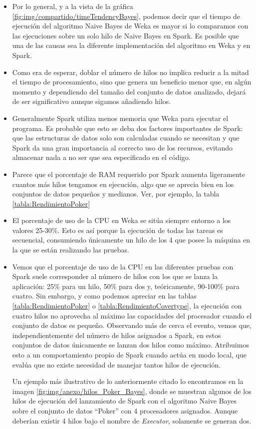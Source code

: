 \begin{itemize}
	\item Por lo general, y a la vista de la gráfica \ref{fig:img/compartido/timeTendencyBayes}, podemos decir que el tiempo de ejecución del algoritmo Naive Bayes de Weka es mayor si lo comparamos con las ejecuciones sobre un solo hilo de Naive Bayes en Spark. Es posible que una de las causas sea la diferente implementación del algoritmo en Weka y en Spark.
	\item Como era de esperar, doblar el número de hilos no implica reducir a la mitad el tiempo de procesamiento, sino que genera un beneficio menor que, en algún momento y dependiendo del tamaño del conjunto de datos analizado, dejará de ser significativo aunque sigamos añadiendo hilos.
	\item Generalmente Spark utiliza menos memoria que Weka para ejecutar el programa. Es probable que esto se deba dos factores importantes de Spark: que las estructuras de datos solo son calculadas cuando se necesitan y que Spark da una gran importancia al correcto uso de los recursos, evitando almacenar nada a no ser que sea especificado en el código.
	\item Parece que el porcentaje de RAM requerido por Spark aumenta ligeramente cuantos más hilos tengamos en ejecución, algo que se aprecia bien en los conjuntos de datos pequeños y medianos. Ver, por ejemplo, la tabla \ref{tabla:RendimientoPoker}
	\item El porcentaje de uso de la CPU en Weka se sitúa siempre entorno a los valores 25-30\%. Esto es así porque la ejecución de todas las tareas es secuencial, consumiendo únicamente un hilo de los 4 que posee la máquina en la que se están realizando las pruebas.
	\item Vemos que el porcentaje de uso de la CPU en las diferentes pruebas con Spark suele corresponder al número de hilos con los que se lanza la aplicación: 25\% para un hilo, 50\% para dos y, teóricamente, 90-100\% para cuatro. Sin embargo, y como podemos apreciar en las tablas \ref{tabla:RendimientoPoker} o \ref{tabla:RendimientoCovertype}, la ejecución con cuatro hilos no aprovecha al máximo las capacidades del procesador cuando el conjunto de datos es pequeño. Observando más de cerca el evento, vemos que, independientemente del número de hilos asignados a Spark, en estos conjuntos de datos únicamente se lanzan dos hilos como máximo. Atribuimos esto a un comportamiento propio de Spark cuando actúa en modo local, que evalúa que no existe necesidad de manejar tantos hilos de ejecución.
	
	Un ejemplo más ilustrativo de lo anteriormente citado lo encontramos en la imagen \ref{fig:img/anexo/hilos_Poker_Bayes}, donde se muestran algunos de los hilos de ejecución del lanzamiento de Spark con el algoritmo Naive Bayes sobre el conjunto de datos ``Poker''  con 4 procesadores asignados. Aunque deberían existir 4 hilos bajo el nombre de \textit{Executor}, solamente se generan dos.
	
\end{itemize}

